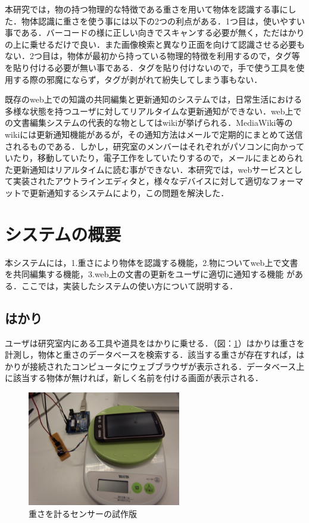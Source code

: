 本研究では，物の持つ物理的な特徴である重さを用いて物体を認識する事にした．物体認識に重さを使う事には以下の2つの利点がある．1つ目は，使いやすい事である．バーコードの様に正しい向きでスキャンする必要が無く，ただはかりの上に乗せるだけで良い．また画像検索と異なり正面を向けて認識させる必要もない．2つ目は，物体が最初から持っている物理的特徴を利用するので，タグ等を貼り付ける必要が無い事である．タグを貼り付けないので，手で使う工具を使用する際の邪魔にならず，タグが剥がれて紛失してしまう事もない．

既存のweb上での知識の共同編集と更新通知のシステムでは，日常生活における多様な状態を持つユーザに対してリアルタイムな更新通知ができない．web上での文書編集システムの代表的な物としてはwikiが挙げられる．MediaWiki\cite{mediawiki}等のwikiには更新通知機能があるが，その通知方法はメールで定期的にまとめて送信されるものである．しかし，研究室のメンバーはそれぞれがパソコンに向かっていたり，移動していたり，電子工作をしていたりするので，メールにまとめられた更新通知はリアルタイムに読む事ができない．本研究では，webサービスとして実装されたアウトラインエディタと，様々なデバイスに対して適切なフォーマットで更新通知するシステムにより，この問題を解決した．


\section{システムの概要}
本システムには，1.重さにより物体を認識する機能，2.物についてweb上で文書を共同編集する機能，3.web上の文書の更新をユーザに適切に通知する機能 がある．ここでは，実装したシステムの使い方について説明する．

\subsection{はかり}

ユーザは研究室内にある工具や道具をはかりに乗せる．（図：\ref{fig:sensor}）はかりは重さを計測し，物体と重さのデータベースを検索する．該当する重さが存在すれば，はかりが接続されたコンピュータにウェブブラウザが表示される．データベース上に該当する物体が無ければ，新しく名前を付ける画面が表示される．

\begin{figure}
  \begin{center}
    \includegraphics[height=50mm]{img/sensor.png}
  \end{center}
  \caption{重さを計るセンサーの試作版}
  \label{fig:sensor}
\end{figure}


